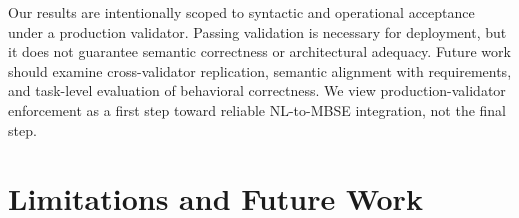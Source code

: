 \documentclass[colorlinks,upint,subscriptcorrection,varvw,hyphenate,balance]{asmeconf} %
\begin{document}
Our results are intentionally scoped to syntactic and operational acceptance under a production validator. Passing validation is necessary for deployment, but it does not guarantee semantic correctness or architectural adequacy. Future work should examine cross-validator replication, semantic alignment with requirements, and task-level evaluation of behavioral correctness. We view production-validator enforcement as a first step toward reliable NL-to-MBSE integration, not the final step.






\section{Limitations and Future Work}
\end{document}
